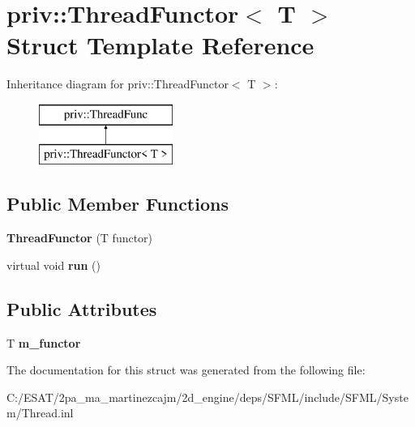 \hypertarget{structpriv_1_1_thread_functor}{}\section{priv\+:\+:Thread\+Functor$<$ T $>$ Struct Template Reference}
\label{structpriv_1_1_thread_functor}
Inheritance diagram for priv\+:\+:Thread\+Functor$<$ T $>$\+:\begin{figure}[H]
\begin{center}
\leavevmode
\includegraphics[height=2.000000cm]{structpriv_1_1_thread_functor}
\end{center}
\end{figure}
\subsection*{Public Member Functions}
\begin{DoxyCompactItemize}
\item 
\mbox{\label{structpriv_1_1_thread_functor_a2df57df5cd6f7396b033512bb0e01848}} 
{\bfseries Thread\+Functor} (T functor)
\item 
\mbox{\label{structpriv_1_1_thread_functor_a8bb44b4b46d08d844d070ae3fdb251d7}} 
virtual void {\bfseries run} ()
\end{DoxyCompactItemize}
\subsection*{Public Attributes}
\begin{DoxyCompactItemize}
\item 
\mbox{\label{structpriv_1_1_thread_functor_a73254bbde4d3452de1aeda531ca632b2}} 
T {\bfseries m\+\_\+functor}
\end{DoxyCompactItemize}


The documentation for this struct was generated from the following file\+:\begin{DoxyCompactItemize}
\item 
C\+:/\+E\+S\+A\+T/2pa\+\_\+ma\+\_\+martinezcajm/2d\+\_\+engine/deps/\+S\+F\+M\+L/include/\+S\+F\+M\+L/\+System/Thread.\+inl\end{DoxyCompactItemize}
